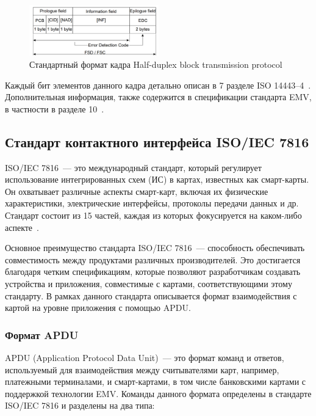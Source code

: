 \begin{figure}[H]
    \centering
    \includegraphics[width=0.5\textwidth]{images/research/hd_block_format}
    \caption{\centering Стандартный формат кадра Half-duplex block transmission protocol}
    \label{fig:hd_block_format}
\end{figure}

Каждый бит элементов данного кадра детально описан в 7 разделе ISO 14443--4~\cite{iso14443-4}.
Дополнительная информация, также содержится в спецификации стандарта EMV, в частности в разделе 10~\cite{emv_specifications_book}.


\subsection{Стандарт контактного интерфейса ISO/IEC 7816}
\label{subsec:7816}

ISO/IEC 7816~--- это международный стандарт, который регулирует использование интегрированных схем (ИС) в картах, известных как смарт-карты.
Он охватывает различные аспекты смарт-карт, включая их физические характеристики, электрические интерфейсы, протоколы передачи данных и др.
Стандарт состоит из 15 частей, каждая из которых фокусируется на каком-либо аспекте~\cite{7816_wiki}.

Основное преимущество стандарта ISO/IEC 7816~--- способность обеспечивать совместимость между продуктами различных производителей.
Это достигается благодаря четким спецификациям, которые позволяют разработчикам создавать устройства и приложения, совместимые с картами, соответствующими этому стандарту.
В рамках данного стандарта описывается формат взаимодействия с картой на уровне приложения с помощью APDU.

\subsubsection{Формат APDU}

APDU (Application Protocol Data Unit)~--- это формат команд и ответов, используемый для взаимодействия между считывателями карт, например, платежными терминалами, и смарт-картами, в том числе банковскими картами с поддержкой технологии EMV.
Команды данного формата определены в стандарте ISO/IEC 7816 и разделены на два типа:

